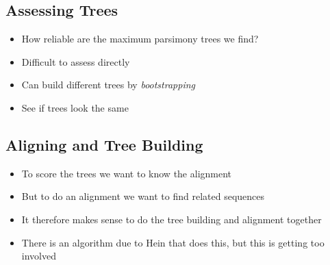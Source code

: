 
\begin{slide}
\section[-1]{Assessing Trees}


\pause
\pb{}
\begin{itemize}
\item How reliable are the maximum parsimony trees we find?\pauseh
\item Difficult to assess directly\pauseh
\item Can build different trees by \emph{bootstrapping}\pauseh
  \begin{center}
    \pause
  \end{center}
\item See if trees look the same\pause
\end{itemize}


\end{slide}


\begin{slide}
\section{Aligning and Tree Building}

\begin{PauseHighLight}
  \begin{itemize}
  \item To score the trees we want to know the alignment\pause
  \item But to do an alignment we want to find related sequences\pause
  \item It therefore makes sense to do the tree building and alignment
    together\pause
  \item There is an algorithm due to Hein that does this, but this is
    getting too involved\pause
  \end{itemize}
\end{PauseHighLight}

\end{slide}




